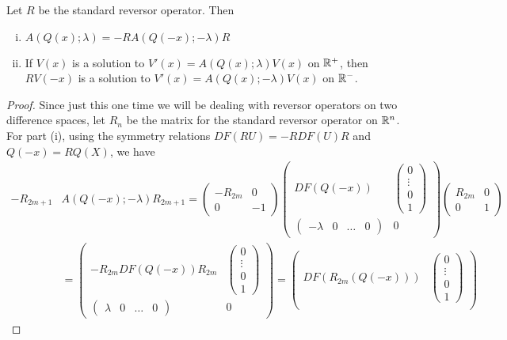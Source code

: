 \documentclass[thesis.tex]{subfiles}
\begin{document}
\begin{lemma}\label{AQxsymmetrylemma}
Let $R$ be the standard reversor operator. Then
\begin{enumerate}[(i)]
\item $A(Q(x); \lambda) = -R A(Q(-x); -\lambda)R$
\item If $V(x)$ is a solution to $V'(x) = A(Q(x); \lambda) V(x)$ on $\mathbb{R}^+$, then $R V(-x)$ is a solution to $V'(x) = A(Q(x); -\lambda) V(x)$ on $\mathbb{R}^-$.
\end{enumerate}
\begin{proof}
Since just this one time we will be dealing with reversor operators on two difference spaces, let $R_{n}$ be the matrix for the standard reversor operator on $\mathbb{R}^n$. For part (i), using the symmetry relations $DF(RU) = -RDF(U)R$ and $Q(-x) = RQ(X)$, we have
\begin{align*}
-R_{2m+1} &A(Q(-x); -\lambda) R_{2m+1}
= \begin{pmatrix}-R_{2m} & 0 \\ 0 & -1 \end{pmatrix} 
\begin{pmatrix}
DF(Q(-x)) & \begin{pmatrix} 0 \\ \vdots \\ 0 \\ 1 \end{pmatrix} \\
\begin{pmatrix} -\lambda & 0 & \dots & 0 \end{pmatrix} & 0
\end{pmatrix} \begin{pmatrix}R_{2m} & 0 \\ 0 & 1 \end{pmatrix} \\
&= \begin{pmatrix}
-R_{2m} DF(Q(-x)) R_{2m} & \begin{pmatrix} 0 \\ \vdots \\ 0 \\ 1 \end{pmatrix} \\
\begin{pmatrix} \lambda & 0 & \dots & 0 \end{pmatrix} & 0
\end{pmatrix} 
= \begin{pmatrix}
DF(R_{2m}(Q(-x))) & \begin{pmatrix} 0 \\ \vdots \\ 0 \\ 1 \end{pmatrix} \\

\end{pmatrix}
\end{align*}
\end{proof}
\end{lemma}
\end{document}
